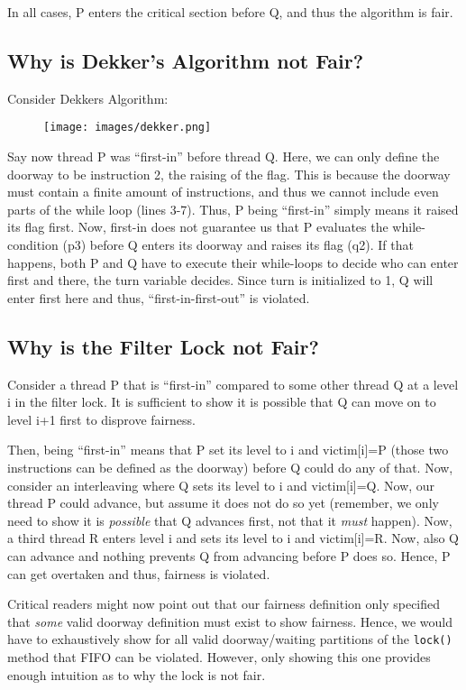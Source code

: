 \documentclass{article}
\begin{document}
    \noindent In all cases, P enters the critical section before Q, and thus the algorithm is fair.

    \subsection{Why is Dekker's Algorithm not Fair?}
    Consider Dekkers Algorithm:

    \begin{figure}[H]
        \centering
        \texttt{[image: images/dekker.png]}
    \end{figure}

    \noindent Say now thread P was ``first-in'' before thread Q. Here, we can only define the doorway to be  instruction 2, the raising of the flag. This is because the doorway must contain a finite amount of instructions, and thus we cannot include even parts of the while loop (lines 3-7). Thus, P being ``first-in'' simply means it raised its flag first. Now, first-in does not guarantee us that P evaluates the while-condition (p3) before Q enters its doorway and raises its flag (q2). If that happens, both P and Q have to execute their while-loops to decide who can enter first and there, the turn variable decides. Since turn is initialized to 1, Q will enter first here and thus, ``first-in-first-out'' is violated.

    \subsection{Why is the Filter Lock not Fair?}
    Consider a thread P that is ``first-in'' compared to some other thread Q at a level i in the filter lock. It is sufficient to show it is possible that Q can move on to level i+1 first to disprove fairness.

    Then, being ``first-in'' means that P set its level to i and victim[i]=P (those two instructions can be defined as the doorway) before Q could do any of that. Now, consider an interleaving where Q sets its level to i and victim[i]=Q. Now, our thread P could advance, but assume it does not do so yet (remember, we only need to show it is \textit{possible} that Q advances first, not that it \textit{must} happen). Now, a third thread R enters level i and sets its level to i and victim[i]=R. Now, also Q can advance and nothing prevents Q from advancing before P does so. Hence, P can get overtaken and thus, fairness is violated.

    Critical readers might now point out that our fairness definition only specified that \textit{some} valid doorway definition must exist to show fairness. Hence, we would have to exhaustively show for all valid doorway/waiting partitions of the \texttt{lock()} method that FIFO can be violated. However, only showing this one provides enough intuition as to why the lock is not fair.
\end{document}
